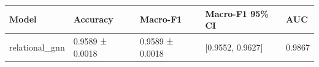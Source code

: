 \begin{tabular}{lllll}
\toprule
Model & Accuracy & Macro-F1 & Macro-F1 95\% CI & AUC \\
\midrule
relational\_gnn & 0.9589 ± 0.0018 & 0.9589 ± 0.0018 & [0.9552, 0.9627] & 0.9867 \\
\bottomrule
\end{tabular}
